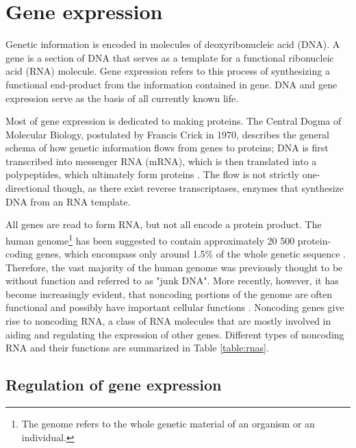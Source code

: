 







\section{Gene expression}\label{gene-expression}

Genetic information is encoded in molecules of deoxyribonucleic acid (DNA). A
gene is a section of DNA that serves as a template for a functional
ribonucleic acid (RNA) molecule. Gene expression refers to this process of
synthesizing a functional end-product from the information contained in gene.
DNA and gene expression serve as the basis of all currently known life.

Most of gene expression is dedicated to making proteins. The Central Dogma of
Molecular Biology, postulated by Francis Crick in 1970, describes the general
schema of how genetic information flows from genes to proteins; DNA is first
transcribed into messenger RNA (mRNA), which is then translated into a polypeptides,
which ultimately form proteins \citep{Crick1970}. The flow is not strictly
one-directional though, as there exist reverse transcriptases, enzymes that
synthesize DNA from an RNA template.

All genes are read to form RNA, but not all encode a protein product. The
human genome\footnote{The genome refers to the whole genetic material of an
organism or an individual.} has been suggested to contain approximately 20 500
protein-coding genes, which encompass only around 1.5\% of the whole genetic
sequence \citep{Clamp2007}. Therefore, the vast majority of the human genome
was previously thought to be without function and referred to as "junk DNA".
More recently, however, it has become increasingly evident, that noncoding
portions of the genome are often functional and possibly have important
cellular functions \citep{ENCODE}. Noncoding genes give rise to noncoding RNA,
a class of RNA molecules that are mostly involved in aiding and regulating the
expression of other genes. Different types of noncoding RNA and their
functions are summarized in Table \ref{table:rnas}.




\subsection{Regulation of gene expression}\label{regulation-of-gene-expression}

